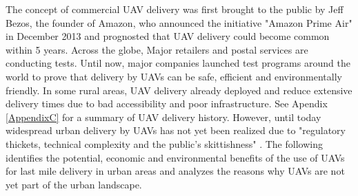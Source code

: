 The concept of commercial UAV delivery was first brought to the public by Jeff Bezos, the founder of Amazon, 
who announced the initiative "Amazon Prime Air" \cite{AmazonPrimeAir} in December 2013
and prognosted that UAV delivery could become common within 5 years. \cite{Manjoo2016}
Across the globe, Major retailers and postal services are conducting tests.
Until now, major companies launched test programs around the world to prove 
that delivery by UAVs can be safe, efficient and environmentally friendly.
In some rural areas, UAV delivery already deployed and reduce extensive delivery times 
due to bad accessibility and poor infrastructure. \cite{McKinsey}
See Apendix \ref{AppendixC} for a summary of UAV delivery history.
However, until today widespread urban delivery by UAVs has not yet been realized due to 
"regulatory thickets, technical complexity and the public’s skittishness" \cite{Rosen2019}.
The following identifies the potential, economic and environmental benefits of the use of UAVs for last mile delivery in urban areas 
and analyzes the reasons why UAVs are not yet part of the urban landscape.

